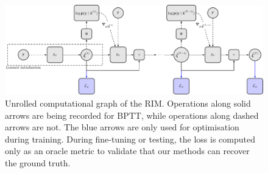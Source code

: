 \begin{figure}[H]
        \centering
        \includegraphics[width=\linewidth]{figures/schematic_rim_unrolled}
        \caption{Unrolled computational graph of the RIM. Operations along solid arrows are being 
        recorded for BPTT, while operations along dashed arrows are not. The blue arrows are only 
        used for optimisation during training. During fine-tuning or testing, the loss is computed only 
        as an oracle metric to validate that our methods can recover the ground truth.}
        \label{fig:unrolled graph}
\end{figure}
